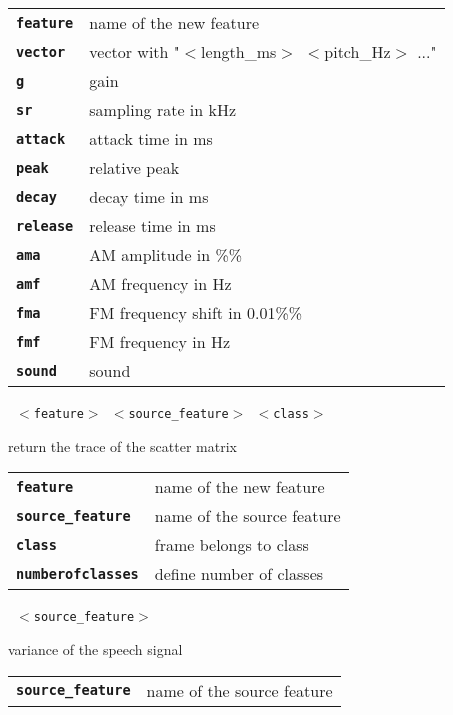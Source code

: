 \begin{description}
\begin{description}
      \begin{tabular}{ll}
 \texttt{\textbf{feature}} &  name of the new feature \\
 \texttt{\textbf{vector}} &   vector with "$<$length\_ms$>$ $<$pitch\_Hz$>$ ..." \\
 \texttt{\textbf{g}} &         gain  \\
 \texttt{\textbf{sr}} &        sampling rate in kHz  \\
 \texttt{\textbf{attack}} &    attack time in ms  \\
 \texttt{\textbf{peak}} &      relative peak  \\
 \texttt{\textbf{decay}} &     decay time in ms  \\
 \texttt{\textbf{release}} &   release time in ms  \\
 \texttt{\textbf{ama}} &       AM amplitude in \%\%  \\
 \texttt{\textbf{amf}} &       AM frequency in Hz  \\
 \texttt{\textbf{fma}} &       FM frequency shift in 0.01\%\%  \\
 \texttt{\textbf{fmf}} &       FM frequency in Hz  \\
 \texttt{\textbf{sound}} &     sound \\
      \end{tabular}
       \texttt{ $<$feature$>$ $<$source\_feature$>$ $<$class$>$ } \

        return the trace of the scatter matrix

      \begin{tabular}{ll}
 \texttt{\textbf{feature}} &         name of the new feature \\
 \texttt{\textbf{source\_feature}} &  name of the source feature \\
 \texttt{\textbf{class}} &           frame belongs to class \\
 \texttt{\textbf{numberofclasses}} &  define number of classes  \\
      \end{tabular}
       \texttt{ $<$source\_feature$>$} \

        variance of the speech signal

      \begin{tabular}{ll}
 \texttt{\textbf{source\_feature}} &  name of the source feature \\
      \end{tabular}
       \texttt{} \


\end{description}
\end{description}

